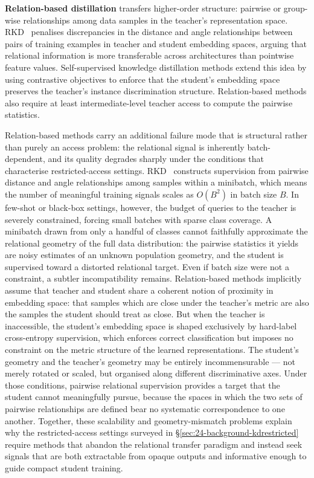 \begin{foldable}
  \textbf{Relation-based distillation} transfers higher-order structure: pairwise or group-wise relationships among data samples in the teacher's representation space.
  RKD~\cite{park2019relational} penalises discrepancies in the distance and angle relationships between pairs of training examples in teacher and student embedding spaces, arguing that relational information is more transferable across architectures than pointwise feature values.
  Self-supervised knowledge distillation methods extend this idea by using contrastive objectives to enforce that the student's embedding space preserves the teacher's instance discrimination structure.
  Relation-based methods also require at least intermediate-level teacher access to compute the pairwise statistics.
\end{foldable}

\begin{foldable}
  Relation-based methods carry an additional failure mode that is structural rather than purely an access problem: the relational signal is inherently batch-dependent, and its quality degrades sharply under the conditions that characterise restricted-access settings.
  RKD~\cite{park2019relational} constructs supervision from pairwise distance and angle relationships among samples within a minibatch, which means the number of meaningful training signals scales as $O(B^2)$ in batch size $B$.
  In few-shot or black-box settings, however, the budget of queries to the teacher is severely constrained, forcing small batches with sparse class coverage.
  A minibatch drawn from only a handful of classes cannot faithfully approximate the relational geometry of the full data distribution: the pairwise statistics it yields are noisy estimates of an unknown population geometry, and the student is supervised toward a distorted relational target.
  Even if batch size were not a constraint, a subtler incompatibility remains.
  Relation-based methods implicitly assume that teacher and student share a coherent notion of proximity in embedding space: that samples which are close under the teacher's metric are also the samples the student should treat as close.
  But when the teacher is inaccessible, the student's embedding space is shaped exclusively by hard-label cross-entropy supervision, which enforces correct classification but imposes no constraint on the metric structure of the learned representations.
  The student's geometry and the teacher's geometry may be entirely incommensurable --- not merely rotated or scaled, but organised along different discriminative axes.
  Under those conditions, pairwise relational supervision provides a target that the student cannot meaningfully pursue, because the spaces in which the two sets of pairwise relationships are defined bear no systematic correspondence to one another.
  Together, these scalability and geometry-mismatch problems explain why the restricted-access settings surveyed in \S\ref{sec:24-background-kdrestricted} require methods that abandon the relational transfer paradigm and instead seek signals that are both extractable from opaque outputs and informative enough to guide compact student training.
\end{foldable}

